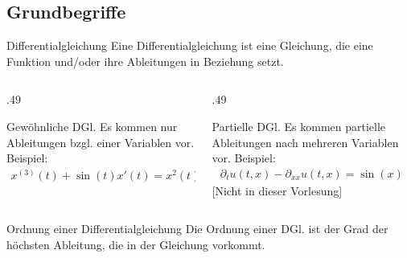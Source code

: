 \subsection{Grundbegriffe}

\begin{frame}
  \begin{block}{Differentialgleichung}
    Eine Differentialgleichung ist eine Gleichung, die eine Funktion
    und/oder ihre Ableitungen in Beziehung setzt.
  \end{block}
  \begin{columns}
    \begin{column}[t]{.49\textwidth}
      \begin{block}{Gewöhnliche DGl.}
        Es kommen nur Ableitungen bzgl. einer Variablen vor. Beispiel:
        \begin{gather*}
          x^{(3)}(t) + \sin(t) x'(t) = x^2(t) +t^2
        \end{gather*}
      \end{block}
    \end{column}
    \begin{column}[t]{.49\textwidth}
      \begin{block}{Partielle DGl.}
        Es kommen partielle Ableitungen nach mehreren Variablen vor.
        Beispiel:
        \begin{gather*}
          \partial_t u(t,x) - \partial_{xx} u(t,x) = \sin(x)
        \end{gather*}
      [Nicht in dieser Vorlesung]
      \end{block}
    \end{column}
  \end{columns}
  \pause
  \begin{block}{Ordnung einer Differentialgleichung}
    Die Ordnung einer DGl. ist der Grad der höchsten Ableitung, die in
    der Gleichung vorkommt.
  \end{block}
\end{frame}

